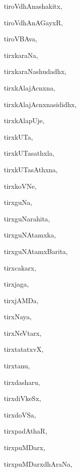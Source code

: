 \begin{multicols}{3}
{\noindent
{tiroVdhAnashakitx}, \pageref{tiroVdhAnashakitx}

\noindent
{tiroVdhAnAGayxR}, \pageref{tiroVdhAnAGayxR}

\noindent
{tiroVBAva}, \pageref{tiroVBAva}

\noindent
{tirxkaraNa}, \pageref{tirxkaraNa}

\noindent
{tirxkaraNashudadhx}, \pageref{tirxkaraNashudadhx}

\noindent
{tirxkAlajAcnxna}, \pageref{tirxkAlajAcnxna}

\noindent
{tirxkAlajAcnxnasididhx}, \pageref{tirxkAlajAcnxnasididhx}

\noindent
{tirxkAlapUje}, \pageref{tirxkAlapUje}

\noindent
{tirxkUTa}, \pageref{tirxkUTa}

\noindent
{tirxkUTasathxla}, \pageref{tirxkUTasathxla}

\noindent
{tirxkUTasAthxna}, \pageref{tirxkUTasAthxna}

\noindent
{tirxkoVNe}, \pageref{tirxkoVNe}

\noindent
{tirxguNa}, \pageref{tirxguNa}

\noindent
{tirxguNarahita}, \pageref{tirxguNarahita}

\noindent
{tirxguNAtamxka}, \pageref{tirxguNAtamxka}

\noindent
{tirxguNAtamxBarita}, \pageref{tirxguNAtamxBarita}

\noindent
{tirxcakarx}, \pageref{tirxcakarx}

\noindent
{tirxjaga}, \pageref{tirxjaga}

\noindent
{tirxjAMDa}, \pageref{tirxjAMDa}

\noindent
{tirxNaya}, \pageref{tirxNaya}

\noindent
{tirxNeVtarx}, \pageref{tirxNeVtarx}

\noindent
{tirxtatatxvX}, \pageref{tirxtatatxvX}

\noindent
{tirxtanu}, \pageref{tirxtanu}

\noindent
{tirxdasharu}, \pageref{tirxdasharu}

\noindent
{tirxdiVkeSx}, \pageref{tirxdiVkeSx}

\noindent
{tirxdoVSa}, \pageref{tirxdoVSa}

\noindent
{tirxpadAthaR}, \pageref{tirxpadAthaR}

\noindent
{tirxpuMDarx}, \pageref{tirxpuMDarx}

\noindent
{tirxpuMDarxdhAraNa}, \pageref{tirxpuMDarxdhAraNa}

}
\end{multicols}
